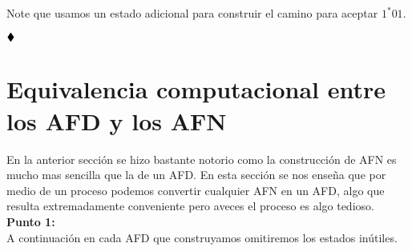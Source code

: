 \begin{itemize}[label={✎}]
\begin{center}
        \end{center}
        Note que usamos un estado adicional para construir el camino para aceptar $1^*01$.
    \end{itemize}

    $\hfill \blacklozenge$

    \section{Equivalencia computacional entre los AFD y los AFN}

    En la anterior sección se hizo bastante notorio como la construcción de AFN es mucho mas sencilla que la de un AFD. En esta sección se nos enseña que por medio de un proceso podemos convertir cualquier AFN en un AFD, algo que resulta extremadamente conveniente pero aveces el proceso es algo tedioso.\\ 

    \textbf{Punto 1:}\\ 
    A continuación en cada AFD que construyamos omitiremos los estados inútiles.\\

